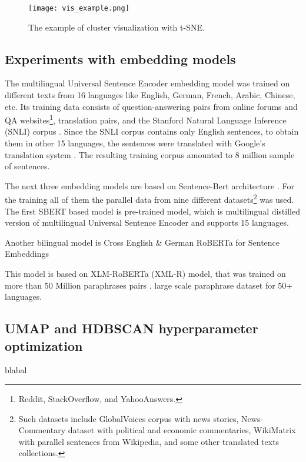 \documentclass[fontsize=12pt,a4paper,twoside,openany]{scrbook}
\begin{document}
\begin{figure}[h]
\centering
\texttt{[image: vis\_example.png]}
\caption{The example of cluster visualization with t-SNE.}
\label{fig:cluster_vis}
\end{figure}


\subsection{Experiments with embedding models}
\label{sec:exp_emb}




The multilingual Universal Sentence Encoder embedding model was trained on different texts from 16 languages like English, German, French, Arabic, Chinese, etc. Its training data consists of question-answering pairs from online forums and QA websites\footnote{Reddit, StackOverflow, and YahooAnswers.}, translation pairs, and the Stanford Natural Language Inference (SNLI) corpus \parencite{Cer18c}. Since the SNLI corpus contains only English sentences, to obtain them in other 15 languages, the sentences were translated with Google's translation system \parencite{Cer18c}. The resulting training corpus amounted to 8 million sample of sentences.

The next three embedding models are based on Sentence-Bert architecture \parencite{Reimers19}. For the training all of them the parallel data from nine different datasets\footnote{Such datasets include GlobalVoices corpus with news stories, News-Commentary dataset with political and economic commentaries, WikiMatrix with parallel sentences from Wikipedia, and some other translated texts collections.} was used. The first SBERT based model is  pre-trained model, which is multilingual distilled version of multilingual Universal Sentence Encoder and supports 15 languages. 


Another bilingual model is Cross English \& German RoBERTa for Sentence Embeddings


This model is based on XLM-RoBERTa (XML-R) model, that was trained on more than 50 Million paraphrases pairs \parencite{Reimers20}.
 large scale paraphrase dataset for 50+ languages. 







\subsection{UMAP and HDBSCAN hyperparameter optimization}
\label{sec:hypeparam}
blabal
\end{document}
